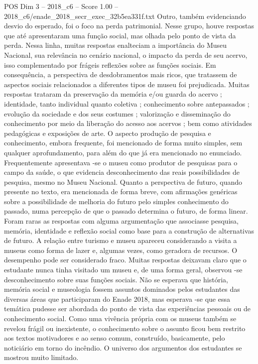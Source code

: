 \begin{textsample}{POS Dim 3 – 2018\_c6 – Score 1.00 – 2018\_c6/enade\_2018\_secr\_exec\_32b5ea331f.txt}
Outro, também evidenciando desvio do esperado, foi o foco na perda patrimonial.
Nesse grupo, houve respostas que até apresentaram uma função social, mas olhada pelo ponto de vista da perda.
Nessa linha, muitas respostas enalteciam a importância do Museu Nacional, sua relevância no cenário nacional, o impacto da perda de seu acervo, isso complementado por frágeis reflexões sobre as funções sociais.
Em consequência, a perspectiva de desdobramentos mais ricos, que tratassem de aspectos sociais relacionados a diferentes tipos de museu foi prejudicada.
Muitas respostas trataram da preservação da memória e/ou guarda do acervo ; identidade, tanto individual quanto coletiva ; conhecimento sobre antepassados ; evolução da sociedade e dos seus costumes ; valorização e disseminação do conhecimento por meio da liberação do acesso aos acervos ; bem como atividades pedagógicas e exposições de arte.
O aspecto produção de pesquisa e conhecimento, embora frequente, foi mencionado de forma muito simples, sem qualquer aprofundamento, para além do que já era mencionado no enunciado.
Frequentemente apresentava -se o museu como produtor de pesquisas para o campo da saúde, o que evidencia desconhecimento das reais possibilidades de pesquisa, mesmo no Museu Nacional.
Quanto a perspectiva de futuro, quando presente no texto, era mencionada de forma breve, com afirmações genéricas sobre a possibilidade de melhoria do futuro pelo simples conhecimento do passado, numa percepção de que o passado determina o futuro, de forma linear.
Foram raras as respostas com alguma argumentação que associasse pesquisa, memória, identidade e reflexão social como base para a construção de alternativas de futuro.
A relação entre turismo e museu apareceu considerando a visita a museus como forma de lazer e, algumas vezes, como geradora de recursos.
O desempenho pode ser considerado fraco.
Muitas respostas deixavam claro que o estudante nunca tinha visitado um museu e, de uma forma geral, observou -se desconhecimento sobre suas funções sociais.
Não se esperava que história, memória social e museologia fossem assuntos dominados pelos estudantes das diversas áreas que participaram do Enade 2018, mas esperava -se que essa temática pudesse ser abordada do ponto de vista das experiências pessoais ou de conhecimento social.
Como uma vivência própria com os museus também se revelou frágil ou inexistente, o conhecimento sobre o assunto ficou bem restrito aos textos motivadores e ao senso comum, construído, basicamente, pelo noticiário em torno do incêndio.
O universo dos argumentos dos estudantes se mostrou muito limitado.

\end{textsample}
